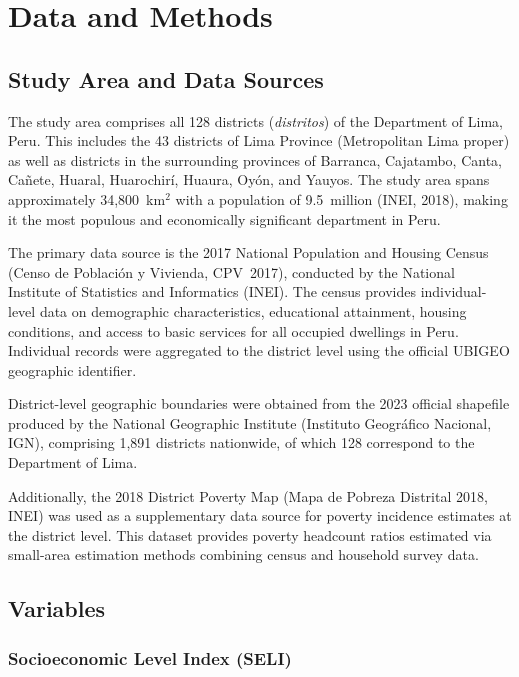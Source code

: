 \documentclass[12pt,a4paper,twoside]{article}
\begin{document}
\section{Data and Methods}

\subsection{Study Area and Data Sources}

The study area comprises all 128 districts (\textit{distritos}) of the Department of
Lima, Peru. This includes the 43 districts of Lima Province (Metropolitan Lima proper)
as well as districts in the surrounding provinces of Barranca, Cajatambo, Canta,
Cañete, Huaral, Huarochirí, Huaura, Oyón, and Yauyos. The study area spans
approximately 34,800~km$^2$ with a population of 9.5~million (INEI, 2018), making
it the most populous and economically significant department in Peru.

The primary data source is the 2017 National Population and Housing Census
(Censo de Población y Vivienda, CPV~2017), conducted by the National Institute of
Statistics and Informatics (INEI). The census provides individual-level data on
demographic characteristics, educational attainment, housing conditions, and access
to basic services for all occupied dwellings in Peru. Individual records were
aggregated to the district level using the official UBIGEO geographic identifier.

District-level geographic boundaries were obtained from the 2023 official shapefile
produced by the National Geographic Institute (Instituto Geográfico Nacional, IGN),
comprising 1,891 districts nationwide, of which 128 correspond to the Department of
Lima.

Additionally, the 2018 District Poverty Map (Mapa de Pobreza Distrital 2018, INEI)
was used as a supplementary data source for poverty incidence estimates at the
district level. This dataset provides poverty headcount ratios estimated via
small-area estimation methods combining census and household survey data.

\subsection{Variables}

\subsubsection{Socioeconomic Level Index (SELI)}
\end{document}
